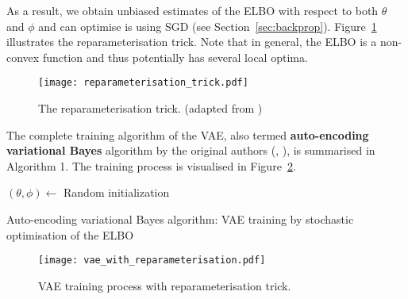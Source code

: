 As a result, we obtain unbiased estimates of the ELBO with respect to both $\theta$ and $\phi$ and can optimise is using SGD (see Section~\ref{sec:backprop}). Figure~\ref{fig:reparam_trick} illustrates the reparameterisation trick. Note that in general, the ELBO is a non-convex function and thus potentially has several local optima.  

\begin{figure}
	\texttt{[image: reparameterisation\_trick.pdf]}
	\caption{The reparameterisation trick. (adapted from \cite[p.~22]{Kingma2019})}
	\label{fig:reparam_trick}
\end{figure}

The complete training algorithm of the VAE, also termed \textbf{auto-encoding variational Bayes} algorithm by the original authors (\cite[p.~21]{Kingma2019}, \cite[p.~4]{Kingma2013}), is summarised in Algorithm 1. The training process is visualised in Figure~\ref{fig:VAE_with_reparam}.

\begin{algorithm}
	\SetAlgoLined
	
	$(\theta, \phi)\leftarrow$ Random initialization\;
	\caption{Auto-encoding variational Bayes algorithm:	VAE training by stochastic optimisation of the ELBO}
	\label{algo-1}
\end{algorithm}

\begin{figure}
	\texttt{[image: vae\_with\_reparameterisation.pdf]}
	\caption{VAE training process with reparameterisation trick.}
	\label{fig:VAE_with_reparam}
\end{figure}

